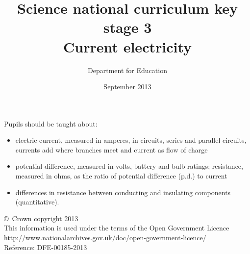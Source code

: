\documentclass[a4paper,12pt]{article}
\begin{document}
\setcounter{secnumdepth}{0}

\title{Science national curriculum key stage 3\\Current electricity}
\author{Department for Education}
\date{September 2013}
\maketitle

\thispagestyle{empty}

Pupils should be taught about:

\begin{itemize}
\item electric current, measured in amperes, in circuits, series and parallel circuits, currents
add where branches meet and current as flow of charge
\item potential difference, measured in volts, battery and bulb ratings; resistance, measured
in ohms, as the ratio of potential difference (p.d.) to current
\item differences in resistance between conducting and insulating components (quantitative).
\end{itemize}

\vfill

\footnotesize
\noindent \copyright\ Crown copyright 2013\\
This information is used under the terms of the Open Government Licence\\
\url{http://www.nationalarchives.gov.uk/doc/open-government-licence/}\\
{\tiny Reference: DFE-00185-2013}
\end{document}

